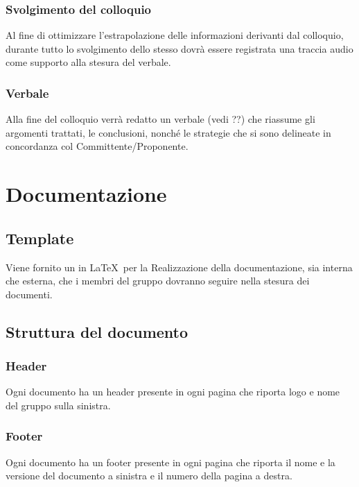 \subsubsection{Svolgimento del colloquio}
Al fine di ottimizzare l'estrapolazione delle informazioni derivanti dal colloquio, durante tutto lo svolgimento dello stesso dovrà essere registrata una traccia audio come supporto alla stesura del verbale. 

\subsubsection{Verbale}
\label{3.4.3}
Alla fine del colloquio verrà redatto un verbale (vedi ??) che riassume gli argomenti trattati, le conclusioni, nonché le strategie che si sono delineate in concordanza col Committente/Proponente.

\newpage
\section{Documentazione}
\label{5.0}

\subsection{Template}
\label{5.1}
Viene fornito un  in \LaTeX\ per la Realizzazione della documentazione, sia interna che esterna, che i membri del gruppo dovranno seguire nella stesura dei documenti.

\subsection{Struttura del documento}
\label{5.2}

\subsubsection{Header}
\label{5.2.1}
Ogni documento ha un header presente in ogni pagina che riporta logo e nome del gruppo sulla sinistra.

\subsubsection{Footer}
\label{5.2.2}
Ogni documento ha un footer presente in ogni pagina che riporta il nome e la versione del documento a sinistra e il numero della pagina a destra.

